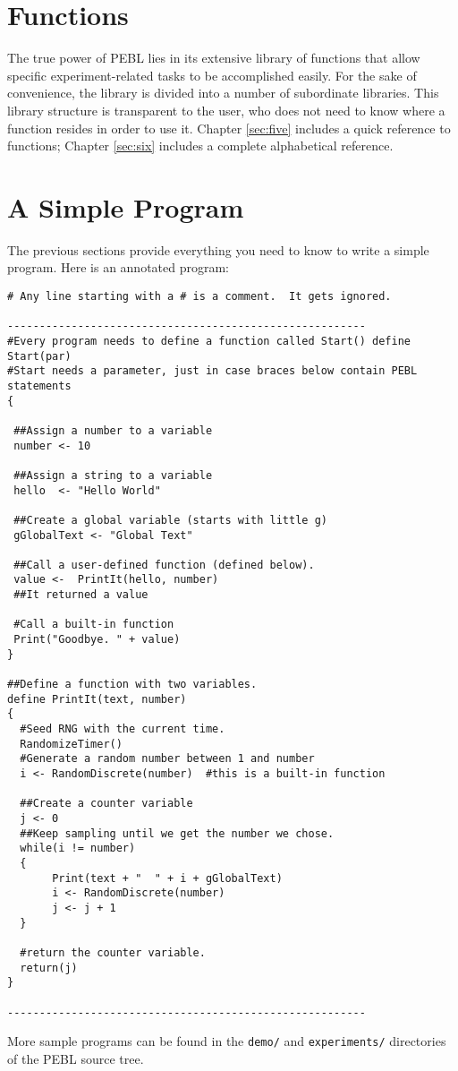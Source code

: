 \section{Functions}

The true power of PEBL lies in its extensive library of
functions that allow specific experiment-related tasks to be
accomplished easily. For the sake of convenience, the library is divided into a number of subordinate libraries.  This library structure
is transparent to the user, who does not need to know where
a function resides in order to use it. Chapter \ref{sec:five} includes a quick reference to functions; Chapter \ref{sec:six} includes a complete alphabetical reference.


\section{ A Simple Program}

The previous sections provide everything you need to know to
write a simple program.  Here is an annotated program:

\begin{verbatim}
# Any line starting with a # is a comment.  It gets ignored.

--------------------------------------------------------
#Every program needs to define a function called Start() define Start(par)
#Start needs a parameter, just in case braces below contain PEBL statements
{

 ##Assign a number to a variable
 number <- 10

 ##Assign a string to a variable
 hello  <- "Hello World"

 ##Create a global variable (starts with little g)
 gGlobalText <- "Global Text"

 ##Call a user-defined function (defined below).
 value <-  PrintIt(hello, number)
 ##It returned a value

 #Call a built-in function
 Print("Goodbye. " + value)
}

##Define a function with two variables.
define PrintIt(text, number)
{
  #Seed RNG with the current time.
  RandomizeTimer()
  #Generate a random number between 1 and number
  i <- RandomDiscrete(number)  #this is a built-in function
  
  ##Create a counter variable
  j <- 0
  ##Keep sampling until we get the number we chose.
  while(i != number)
  {
       Print(text + "  " + i + gGlobalText)
       i <- RandomDiscrete(number)
       j <- j + 1
  }

  #return the counter variable.
  return(j)
}

--------------------------------------------------------

\end{verbatim}
More sample programs can be found in the \texttt{demo/} and \texttt{experiments/} directories of the PEBL source tree.


